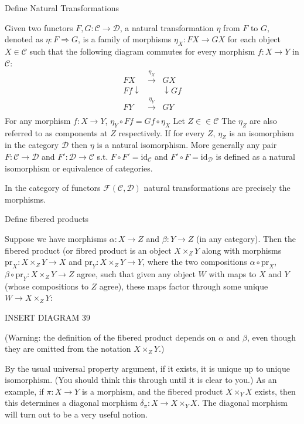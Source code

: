 Define Natural Transformations

Given two functors \(F, G: \mathcal{C} \to \mathcal{D}\), a natural transformation \(\eta\) from \(F\) to \(G\), 
denoted as \(\eta: F \Rightarrow G\), is a family of morphisms \(\eta_X: FX \to GX\) for each object \(X \in \mathcal{C}\) 
such that the following diagram commutes for every morphism \(f: X \to Y\) in \(\mathcal{C}\):
\[
\begin{array}{ccc}
FX & \xrightarrow{\eta_X} & GX \\
Ff \downarrow & & \downarrow Gf \\
FY & \xrightarrow{\eta_Y} & GY \\
\end{array}
\]
For any morphism \(f: X \to Y\), 
\(\eta_Y \circ Ff = Gf \circ \eta_X\)
Let \( Z \in \in \mathcal{C} \)
The \( \eta_Z \) are also referred to as components at \( Z \) respectively.
If for every \( Z \), \( \eta_Z \) is an isomorphism in the category \( \mathcal{D} \)
then \( \eta \) is a natural isomorphism. 
More generally any pair \( F : \mathcal{C} \to \mathcal{D} \)
and \( F' : \mathcal{D} \to \mathcal{C} \) s.t. \( F \circ F' = \text{id}_{\mathcal{C}} \) and 
\( F' \circ F = \text{id}_{\mathcal{D}} \) is defined as a natural isomorphism or equivalence of categories.

In the category of functors \( \mathcal{F}(\mathcal{C}, \mathcal{D}) \) natural transformations are precisely the morphisms.


Define fibered products

Suppose we have morphisms \(\alpha: X \to Z\) and \(\beta: Y \to Z\) (in any category). Then the fibered product (or fibred product is an object \(X \times_Z Y\) 
along with morphisms \(\mathrm{pr}_X: X \times_Z Y \to X\) and \(\mathrm{pr}_Y: X \times_Z Y \to Y\), where the two compositions 
\(\alpha \circ \mathrm{pr}_X\), \(\beta \circ \mathrm{pr}_Y: X \times_Z Y \to Z\) agree, such that given any object \(W\) with maps to \(X\) and \(Y\) 
(whose compositions to \(Z\) agree), these maps factor through some unique \(W \to X \times_Z Y\):

INSERT DIAGRAM 39

(Warning: the definition of the fibered product depends on \(\alpha\) and \(\beta\), even though they are omitted from the notation \(X \times_Z Y\).)

By the usual universal property argument, if it exists, it is unique up to unique isomorphism. (You should think this through until it is clear to you.)
As an example, if \(\pi: X \to Y\) is a morphism, and the fibered product \(X \times_Y X\) exists, 
then this determines a diagonal morphism \(\delta_\pi: X \to X \times_Y X\). The diagonal morphism will turn out to be a very useful notion.

